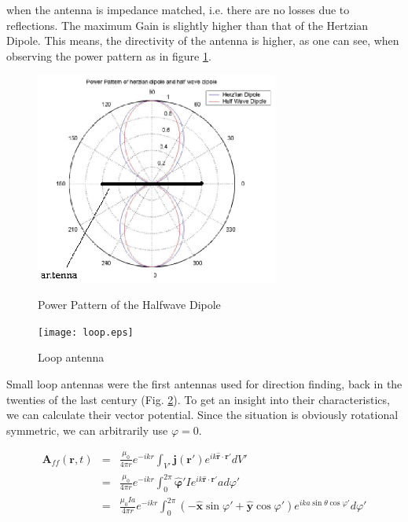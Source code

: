 \documentclass[a4paper,14pt]{extbook}
\begin{document}
when the antenna is impedance matched, i.e. there are no losses due to reflections. The maximum Gain is slightly higher than that of the Hertzian Dipole. This means, the directivity of the antenna is higher, as one can see, when observing the power pattern as in figure \ref{fig_pp_shd}.

\begin{figure}
 \begin{center}
 \includegraphics[width=8cm]{pp_shd}\\
  \caption{Power Pattern of the Halfwave Dipole}\label{fig_pp_shd}
  \end{center}
\end{figure}

\begin{figure}
  \texttt{[image: loop.eps]}\\
  \caption{Loop antenna}\label{fig_loop}
\end{figure}

Small loop antennas were the first antennas used for direction finding, back in the twenties of the last century (Fig. \ref{fig_loop}). To get an insight into their characteristics, we can calculate their vector potential. Since the situation is obviously rotational symmetric, we can arbitrarily use $\varphi=0$.

\begin{eqnarray}\label{A_loop}
 \mathbf{A}_{ff}(\mathbf{r},t) &=& \frac{\mu_0}{4 \pi r} e^{-ikr} \int_{V'} \mathbf{j}(\mathbf{r}') e^{ik \mathbf{\hat{r}} \cdot \mathbf{r}' } dV' \\
&=& \frac{\mu_0}{4 \pi r} e^{-ikr} \int_{0}^{2\pi}\mathbf{ \hat{\varphi}'} I e^{ik \mathbf{\hat{r}} \cdot \mathbf{r}' } a d\varphi' \nonumber \\
&=& \frac{\mu_0 I a}{4 \pi r} e^{-ikr} \int_{0}^{2\pi} (-\mathbf{\hat{x}}\sin \varphi ' + \mathbf{\hat{y}} \cos \varphi ') e^{ik a\sin \theta \cos \varphi' }  d\varphi' \nonumber
\end{eqnarray}
\end{document}
